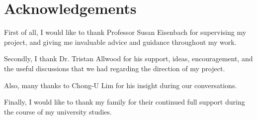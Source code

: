 \chapter*{Acknowledgements}

First of all, I would like to thank Professor Susan Eisenbach for supervising my project, and giving me invaluable advice and guidance throughout my work.

Secondly, I thank Dr. Tristan Allwood for his support, ideas, encouragement, and the useful discussions that we had regarding the direction of my project.

Also, many thanks to Chong-U Lim for his insight during our conversations.

Finally, I would like to thank my family for their continued full support during the course of my university studies.
